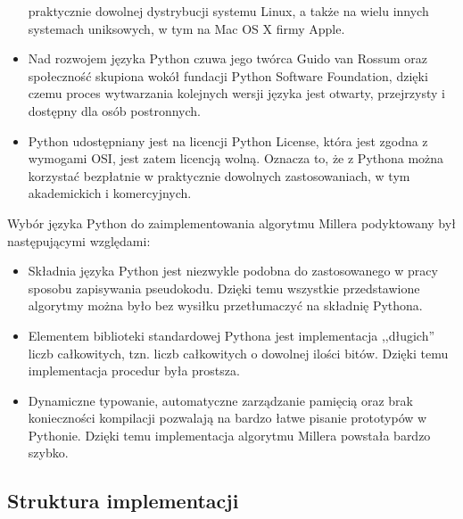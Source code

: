 \begin{itemize}
praktycznie dowolnej dystrybucji systemu Linux,
a także na wielu innych systemach uniksowych,
w tym na Mac OS X firmy Apple.
\item
Nad rozwojem języka Python czuwa jego twórca Guido van Rossum
oraz społeczność skupiona wokół fundacji Python Software Foundation,
dzięki czemu proces wytwarzania kolejnych wersji języka
jest otwarty, przejrzysty i dostępny dla osób postronnych.
\item
Python udostępniany jest na licencji Python License,
która jest zgodna z wymogami OSI, jest zatem licencją wolną.
Oznacza to, że z Pythona można korzystać bezpłatnie
w praktycznie dowolnych zastosowaniach, w tym akademickich i komercyjnych.
\end{itemize}

\noindent
Wybór języka Python do zaimplementowania algorytmu Millera
podyktowany był następującymi względami:
\begin{itemize}
\item
Składnia języka Python jest niezwykle podobna
do zastosowanego w pracy sposobu zapisywania pseudokodu.
Dzięki temu wszystkie przedstawione algorytmy
można było bez wysiłku przetłumaczyć
na składnię Pythona.
\item
Elementem biblioteki standardowej Pythona
jest implementacja ,,długich'' liczb całkowitych,
tzn. liczb całkowitych o dowolnej ilości bitów.
Dzięki temu implementacja procedur była prostsza.
\item
Dynamiczne typowanie, automatyczne zarządzanie pamięcią
oraz brak konieczności kompilacji
pozwalają na bardzo łatwe pisanie prototypów w Pythonie.
Dzięki temu implementacja algorytmu Millera powstała bardzo szybko.
\end{itemize}

\subsection*{Struktura implementacji}


